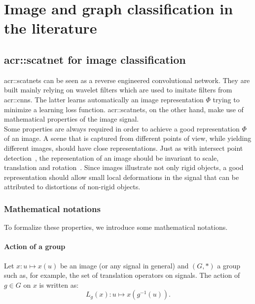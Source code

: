 \minitoc

\vfill

\clearpage

\section{Image and graph classification in the literature}
    \label{sec::better_representation::literature}
    \subsection{\acrlong*{acr::scatnet} for image classification}
        \label{sec::better_representation::literature::scatnet}
        \glspl{acr::scatnet} can be seen as a reverse engineered convolutional network.
        They are built mainly relying on wavelet filters which are used to imitate filters from \glspl{acr::cnn}.
        The latter learns automatically an image representation $\Phi$ trying to minimize a learning loss function.
        \Glspl{acr::scatnet}, on the other hand, make use of mathematical properties of the image signal.\\

        Some properties are always required in order to achieve a good representation $\Phi$ of an image. 
        A scene that is captured from different points of view, while yielding different images, should have close representations.
        Just as with intersect point detection~\parencite{lowe2004distinctive}, the representation of an image should be invariant to scale, translation and rotation~\parencite{mallat2012group,sifre2013rotation,bruna2013invariant}.
        Since images illustrate not only rigid objects, a good representation should allow small local deformations in the signal that can be attributed to distortions of non-rigid objects.\\

        \subsubsection{Mathematical notations}
            To formalize these properties, we introduce some mathematical notations.
            \paragraph{Action of a group}
                Let $x: u \mapsto x(u)$ be an image (or any signal in general) and $(G, *)$ a group such as, for example, the set of translation operators on signals.
                The action of $g\in G$ on $x$ is written as:
                \begin{equation}
                    \label{eq::action_group}
                    L_g(x): u \mapsto x\left(g^{-1}(u)\right).
                \end{equation}
            
